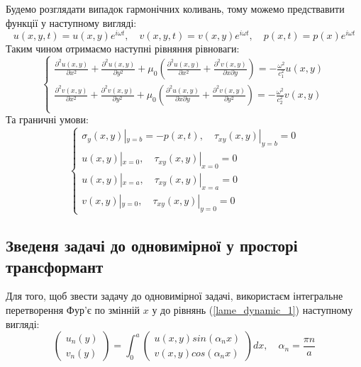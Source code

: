 Будемо розглядати випадок гармонічних коливань, тому можемо предствавити функції у наступному вигляді:
\begin{equation}
    u(x,y,t) = u(x,y) e^{i \omega t}, \quad v(x,y,t) = v(x,y) e^{i \omega t}, \quad p(x,t) = p(x) e^{i \omega t}
\end{equation}
Таким чином отримаємо наступні рівняння рівноваги:
\begin{equation}\label{lame_dynamic_1}
    \begin{cases}
        \frac{\partial^2 u(x,y)}{\partial x^2} + \frac{\partial^2 u(x,y)}{\partial y^2} + \mu_0 (\frac{\partial^2 u(x,y)}{\partial x^2} + \frac{\partial^2 v(x,y)}{\partial x\partial y}) = -\frac{\omega^2}{c_1^2}  u(x,y) \\
        \frac{\partial^2 v(x,y)}{\partial x^2} + \frac{\partial^2 v(x,y)}{\partial y^2} + \mu_0 (\frac{\partial^2 u(x,y)}{\partial x \partial y} + \frac{\partial^2 v(x,y)}{\partial y^2}) = -\frac{\omega^2}{c_2^2} v(x,y) \\
    \end{cases}
\end{equation}
Та граничні умови:
\begin{equation}\label{bound_dynamic_1}
    \begin{cases}
        \sigma_y(x, y) |_{y=b} = -p(x, t), \quad  \tau_{xy}(x,y) |_{y=b} =0 \\
        u(x,y) |_{x=0}, \quad \tau_{xy}(x,y) |_{x=0} =0 \\
        u(x,y) |_{x=a}, \quad \tau_{xy}(x,y) |_{x=a} =0 \\
        v(x,y) |_{y=0}, \quad \tau_{xy}(x,y) |_{y=0} =0
    \end{cases}
\end{equation}

\subsection{Зведеня задачі до одновимірної у просторі трансформант}
Для того, щоб звести задачу до одновимірної задачі, використаєм інтегральне перетворення Фур'є по змінній $x$ у до рівнянь (\ref{lame_dynamic_1}) наступному вигляді:
\begin{equation}
    \begin{pmatrix}
        u_n(y) \\
        v_n(y)
    \end{pmatrix} = \int_{0}^{a} 
    \begin{pmatrix}
        u(x,y) sin(\alpha_n x) \\
        v(x,y) cos(\alpha_n x)
    \end{pmatrix} dx, \quad \alpha_n = \frac{\pi n}{a}
\end{equation}


